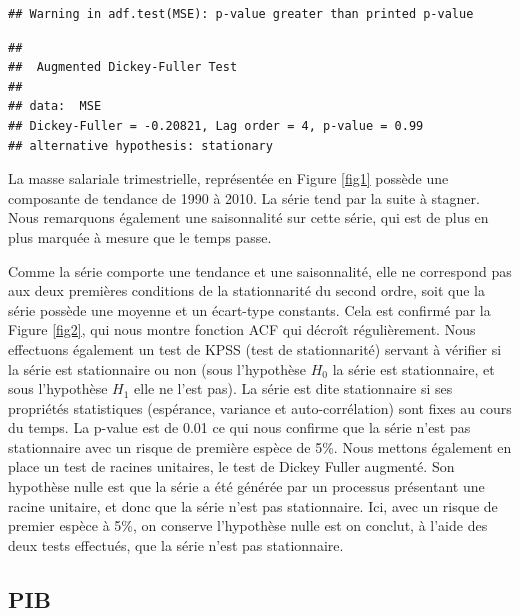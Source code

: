\documentclass[11pt,]{article}
\begin{document}
\begin{verbatim}
## Warning in adf.test(MSE): p-value greater than printed p-value
\end{verbatim}

\begin{verbatim}
## 
##  Augmented Dickey-Fuller Test
## 
## data:  MSE
## Dickey-Fuller = -0.20821, Lag order = 4, p-value = 0.99
## alternative hypothesis: stationary
\end{verbatim}

La masse salariale trimestrielle, représentée en Figure \ref{fig1}
possède une composante de tendance de 1990 à 2010. La série tend par la
suite à stagner. Nous remarquons également une saisonnalité sur cette
série, qui est de plus en plus marquée à mesure que le temps passe.

Comme la série comporte une tendance et une saisonnalité, elle ne
correspond pas aux deux premières conditions de la stationnarité du
second ordre, soit que la série possède une moyenne et un écart-type
constants. Cela est confirmé par la Figure \ref{fig2}, qui nous montre
fonction ACF qui décroît régulièrement. Nous effectuons également un
test de KPSS (test de stationnarité) servant à vérifier si la série est
stationnaire ou non (sous l'hypothèse \(H_{0}\) la série est
stationnaire, et sous l'hypothèse \(H_{1}\) elle ne l'est pas). La série
est dite stationnaire si ses propriétés statistiques (espérance,
variance et auto-corrélation) sont fixes au cours du temps. La p-value
est de 0.01 ce qui nous confirme que la série n'est pas stationnaire
avec un risque de première espèce de 5\%. Nous mettons également en
place un test de racines unitaires, le test de Dickey Fuller augmenté.
Son hypothèse nulle est que la série a été générée par un processus
présentant une racine unitaire, et donc que la série n'est pas
stationnaire. Ici, avec un risque de premier espèce à 5\%, on conserve
l'hypothèse nulle est on conclut, à l'aide des deux tests effectués, que
la série n'est pas stationnaire.

\subsection{\texorpdfstring{PIB \label{PIB}}{PIB }}\label{pib}
\end{document}
